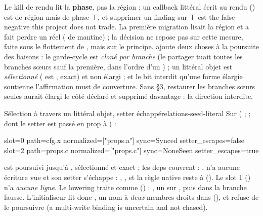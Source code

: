 \begin{decision}
Le kill de rendu lit la \textbf{phase}, pas la région : un callback littéral écrit au rendu () est de région  mais de phase ⊤, et supprimer un finding sur ⊤ est \og the false negative this project does not trade\fg{}. La première migration lisait la région et a fait perdre un \Warning{} réel ( de mantine) ; la décision ne repose pas sur cette mesure, faite sous le flottement de , mais sur le principe.  ajoute deux choses à la poursuite des liaisons : le garde-cycle  est \emph{cloné par branche} (le partager tuait toutes les branches sœurs sauf la première, dans l'ordre d'un ) ; un littéral objet est \emph{sélectionné} ( est , exact) et non élargi ; et le bit  interdit qu'une forme élargie soutienne l'affirmation must de couverture. Sans §3, restaurer les branches sœurs seules aurait élargi le côté déclaré et supprimé davantage : la direction interdite.
\end{decision}

\begin{exemple}{Sélection à travers un littéral objet, setter échappé}{relations-seed-literal}
Sur  ( ;  ;  dont le setter est passé en prop à ) :
\begin{sortie}
  slot=0 path=cfg.x   normalized=["props.a"] sync=Synced   setter_escapes=false
  slot=2 path=props.c normalized=["props.c"] sync=NoneSeen setter_escapes=true
\end{sortie}
 est poursuivi jusqu'à , sélectionné et exact ; les deps \code{[props.a]} couvrent : .  n'a aucune écriture vue et son setter s'échappe : , , et la règle native reste à \Warning{} (). Le slot 1 () n'a \emph{aucune ligne}. Le lowering traite  comme \code{||} () : , un  sur , puis  dans la branche fausse. L'initialiseur lit donc , un nom à \emph{deux} membres droits dans  (), et  refuse de le poursuivre (\og a multi-write binding is uncertain and not chased\fg{}).
\end{exemple}

